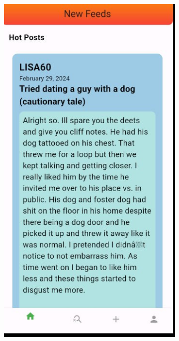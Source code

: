\begin{figure}[ht]
\begin{subfigure}{0.3\textwidth}
  \end{subfigure}%
  \hfill
  \begin{subfigure}{0.31\textwidth}
    \includegraphics[width=\linewidth]{img/hot feed.jpg}
  \end{subfigure}%
  \hfill
  \begin{subfigure}{0.3\textwidth}

\end{subfigure}
\end{figure}
